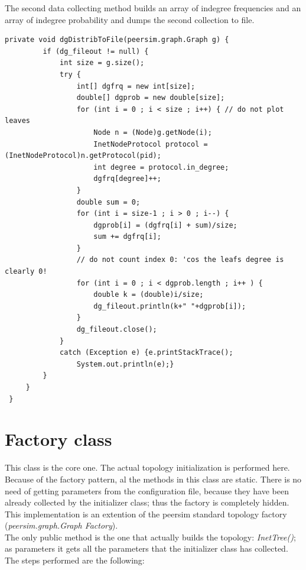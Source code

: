 \documentclass[a4paper,12pt]{article}
\begin{document}
 The second data collecting method builds an array of indegree frequencies 
and an array of indegree probability and dumps the second collection to file.

\footnotesize
\begin{verbatim}
private void dgDistribToFile(peersim.graph.Graph g) {
         if (dg_fileout != null) { 
             int size = g.size();
             try {
                 int[] dgfrq = new int[size];
                 double[] dgprob = new double[size];
                 for (int i = 0 ; i < size ; i++) { // do not plot leaves
                     Node n = (Node)g.getNode(i);
                     InetNodeProtocol protocol = (InetNodeProtocol)n.getProtocol(pid);
                     int degree = protocol.in_degree;
                     dgfrq[degree]++;
                 }
                 double sum = 0;
                 for (int i = size-1 ; i > 0 ; i--) {
                     dgprob[i] = (dgfrq[i] + sum)/size;
                     sum += dgfrq[i];
                 }
                 // do not count index 0: 'cos the leafs degree is clearly 0!
                 for (int i = 0 ; i < dgprob.length ; i++ ) {
                     double k = (double)i/size;
                     dg_fileout.println(k+" "+dgprob[i]);
                 }
                 dg_fileout.close();
             }
             catch (Exception e) {e.printStackTrace();
                 System.out.println(e);}
         }   
     }
 }
\end{verbatim}
\normalsize

\section{Factory class}

 This class is the core one. The actual topology initialization is performed 
here. Because of the factory pattern, al the methods in this class are 
static. There is no need of getting parameters from the configuration file, 
because they have been already collected by the initializer class; thus 
the factory is completely hidden.\\
 This implementation is an extention of the peersim standard topology 
factory (\emph{peersim.graph.Graph Factory}).\\

 The only public method is the one that actually builds the topology: 
\emph{InetTree()}; as parameters it gets all the parameters that the 
initializer class has collected. The steps performed are the following:
 
\end{document}
